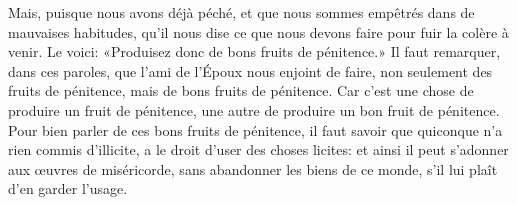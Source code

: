 Mais, puisque nous avons déjà péché,
	et que nous sommes empêtrés dans de mauvaises habitudes,
	qu’il nous dise ce que nous devons faire pour fuir la colère à venir.
Le voici: «Produisez donc de bons fruits de pénitence.»
Il faut remarquer, dans ces paroles, que l’ami de l’Époux nous enjoint de faire,
	non seulement des fruits de pénitence, mais de bons fruits de pénitence.
Car c’est une chose de produire un fruit de pénitence,
	une autre de produire un bon fruit de pénitence.
Pour bien parler de ces bons fruits de pénitence,
	il faut savoir que quiconque n’a rien commis d’illicite,
	a le droit d’user des choses licites:
	et ainsi il peut s’adonner aux œuvres de miséricorde,
	sans abandonner les biens de ce monde, s’il lui plaît d’en garder l’usage.
